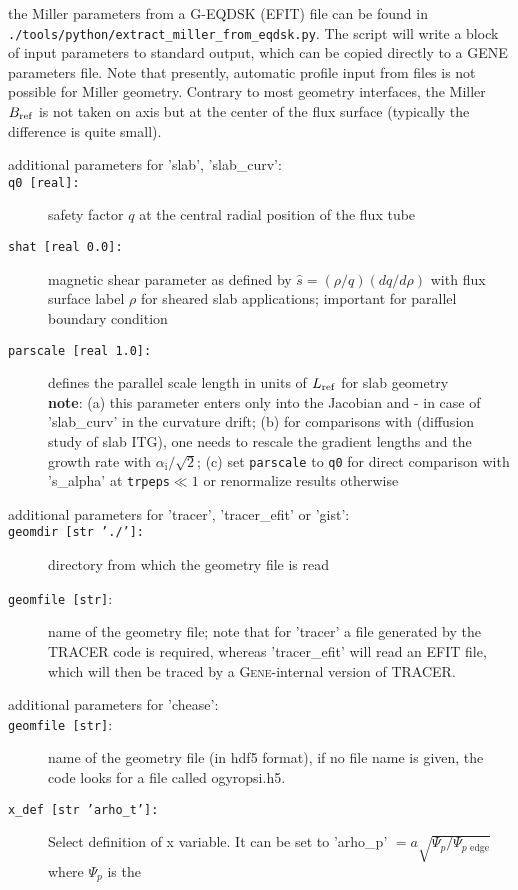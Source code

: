 \documentclass[12pt]{article}
\begin{document}
the Miller parameters from a G-EQDSK (EFIT) file can be found in {\tt ./tools/python/extract\_miller\_from\_eqdsk.py}.
The script will write a block of input parameters to standard output, which can be copied directly
to a GENE parameters file. Note that presently, automatic profile input from files is not possible for Miller geometry.
Contrary to most geometry interfaces, the Miller $B_{\rm ref}$ is not taken on axis but at the center
of the flux surface (typically the difference is quite small).
%
\begin{description}
\item[additional parameters for 'slab', 'slab\_curv':]
\item[\hypertarget{q0}{\texttt{q0 [real]:}}] safety factor $q$ at the central radial position of the flux tube
\item[\texttt{shat [real 0.0]:}] magnetic shear parameter as defined by $\hat s=(\rho/q)(dq/d\rho)$ with flux surface label $\rho$
for sheared slab applications; important for parallel boundary condition
\item[\texttt{parscale [real 1.0]:}] defines the parallel scale length
in units of $L_{\rm ref}$ for slab geometry\\
\textbf{note}: (a) this parameter enters only into the Jacobian and - in case of 'slab\_curv' in the curvature drift; (b) for
comparisons with \cite{diffusion} (diffusion study of slab ITG), one needs to
rescale the gradient lengths and the growth rate with $\alpha_\mathrm{i} / \sqrt{2}$;
(c) set {\tt parscale} to {\tt q0} for direct comparison with 's\_alpha' at {\tt trpeps}$\ll 1$ or renormalize results otherwise
%
\item[additional parameters for 'tracer', 'tracer\_efit' or 'gist':]
\item[\texttt{geomdir [str './']:}] directory from which the geometry file is read
\item[\texttt{geomfile [str]}:] name of the geometry file; note that for 'tracer' a file generated by
the TRACER code is required, whereas 'tracer\_efit' will read an EFIT file, which will then be traced
by a \textsc{Gene}-internal version of TRACER.
\item[additional parameters for 'chease':]
\item[\texttt{geomfile [str]}:] name of the geometry file (in hdf5 format), if
  no file name is given, the code looks for a file called ogyropsi.h5.
\item[\texttt{x\_def [str 'arho\_t']:}] Select definition of x variable.  It can be
  set to 'arho\_p' $=a \sqrt{\Psi_p / \Psi_{p\mbox{ edge}}}$ where $\Psi_p$ is the

\end{description}
\end{document}
